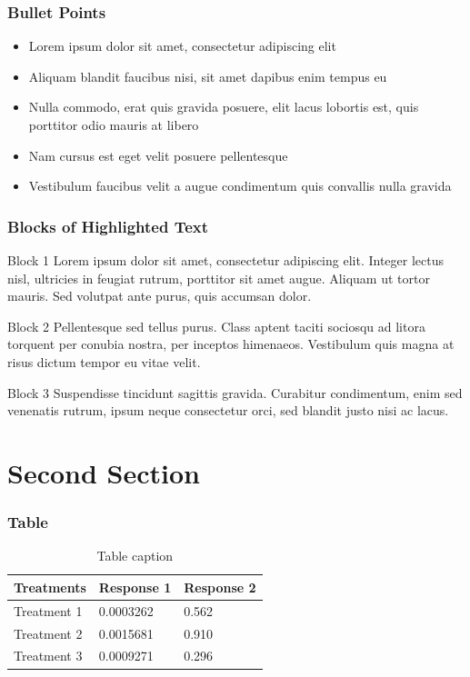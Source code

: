 \documentclass{beamer}
\begin{document}
\begin{frame}
\frametitle{Bullet Points}
\begin{itemize}
\item Lorem ipsum dolor sit amet, consectetur adipiscing elit
\item Aliquam blandit faucibus nisi, sit amet dapibus enim tempus eu
\item Nulla commodo, erat quis gravida posuere, elit lacus lobortis est, quis porttitor odio mauris at libero
\item Nam cursus est eget velit posuere pellentesque
\item Vestibulum faucibus velit a augue condimentum quis convallis nulla gravida
\end{itemize}
\end{frame}


\begin{frame}
\frametitle{Blocks of Highlighted Text}
\begin{block}{Block 1}
Lorem ipsum dolor sit amet, consectetur adipiscing elit. Integer lectus nisl, ultricies in feugiat rutrum, porttitor sit amet augue. Aliquam ut tortor mauris. Sed volutpat ante purus, quis accumsan dolor.
\end{block}

\begin{block}{Block 2}
Pellentesque sed tellus purus. Class aptent taciti sociosqu ad litora torquent per conubia nostra, per inceptos himenaeos. Vestibulum quis magna at risus dictum tempor eu vitae velit.
\end{block}

\begin{block}{Block 3}
Suspendisse tincidunt sagittis gravida. Curabitur condimentum, enim sed venenatis rutrum, ipsum neque consectetur orci, sed blandit justo nisi ac lacus.
\end{block}
\end{frame}



\section{Second Section}

\begin{frame}
\frametitle{Table}
\begin{table}
\begin{tabular}{l l l}
\toprule
\textbf{Treatments} & \textbf{Response 1} & \textbf{Response 2}\\
\midrule
Treatment 1 & 0.0003262 & 0.562 \\
Treatment 2 & 0.0015681 & 0.910 \\
Treatment 3 & 0.0009271 & 0.296 \\
\bottomrule
\end{tabular}
\caption{Table caption}
\end{table}
\end{frame}
\end{document}
